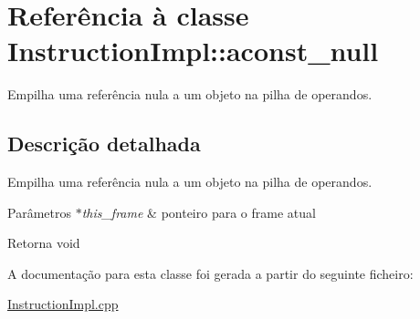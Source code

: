\hypertarget{class_instruction_impl_1_1aconst__null}{}\section{Referência à classe Instruction\+Impl\+:\+:aconst\+\_\+null}
\label{class_instruction_impl_1_1aconst__null}


Empilha uma referência nula a um objeto na pilha de operandos.  




\subsection{Descrição detalhada}
Empilha uma referência nula a um objeto na pilha de operandos. 


\begin{DoxyParams}{Parâmetros}
{\em $\ast$this\+\_\+frame} & ponteiro para o frame atual \\
\hline
\end{DoxyParams}
\begin{DoxyReturn}{Retorna}
void 
\end{DoxyReturn}


A documentação para esta classe foi gerada a partir do seguinte ficheiro\+:\begin{DoxyCompactItemize}
\item 
\hyperlink{_instruction_impl_8cpp}{Instruction\+Impl.\+cpp}\end{DoxyCompactItemize}
